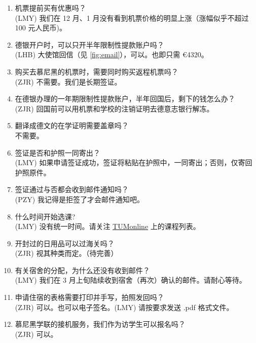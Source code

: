 \documentclass{ctexart}
\begin{document}
\begin{enumerate}
  (LMY) \href{https://service2.diplo.de/rktermin/extern/choose_category.do?locationCode=peki&realmId=12&categoryId=156&request_locale=de}{在线系统预约签证受理}。见 \ref{sec:visa} 节。请务必选择德语界面。英语界面会有部分文字缺失。德语界面在填写时会提供 德/英/中 三语。
  \item 机票提前买有优惠吗？ \\
  (LMY) 我们在 12 月、1 月没有看到机票价格的明显上涨（涨幅似乎不超过 100 元人民币)。
  \item 德银开户时，可以只开半年限制性提款账户吗？ \\
  (LHB) 大使馆回信（见 \ref{fig:email}），可以。也即只需 \euro{4320}。
  \item 购买去慕尼黑的机票时，需要同时购买返程机票吗？ \\
  (ZJR) 不需要。我们是长期签证。
  \item 在德银办理的一年期限制性提款账户，半年回国后，剩下的钱怎么办？ \\
  (ZJR) 回国前可以用机票和学校的注销证明去德意志银行解冻。
  \item 翻译成德文的在学证明需要盖章吗？ \\
  不需要。
  \item 签证是否和护照一同寄出？ \\
  (LMY) 如果申请签证成功，签证将粘贴在护照中，一同寄出；否则，仅寄回护照原件。
  \item 签证通过与否都会收到邮件通知吗？ \\
  (PZY) 我记得是拒签了才会邮件通知吧。
  \item 什么时间开始选课? \\
  (LMY) 没有统一时间。请关注 \href{campus.tum.de}{TUMonline} 上的课程列表。
  \item 开封过的日用品可以过海关吗？ \\
  (ZJR) 视其种类而定。（待完善）
  \item 有关宿舍的分配，为什么还没有收到邮件？ \\
  (LMY) 我们在 3 月上旬陆续收到宿舍（再次）确认的邮件。请耐心等待。
  \item 申请住宿的表格需要打印并手写，拍照发回吗？ \\
  (ZJR) 可以。也可以电子签名。(LMY) 请按要求发送 .pdf 格式文件。
  \item 慕尼黑学联的接机服务，我们作为访学生可以报名吗？ \\
  (ZJR) 可以。


\end{enumerate}
\end{document}
